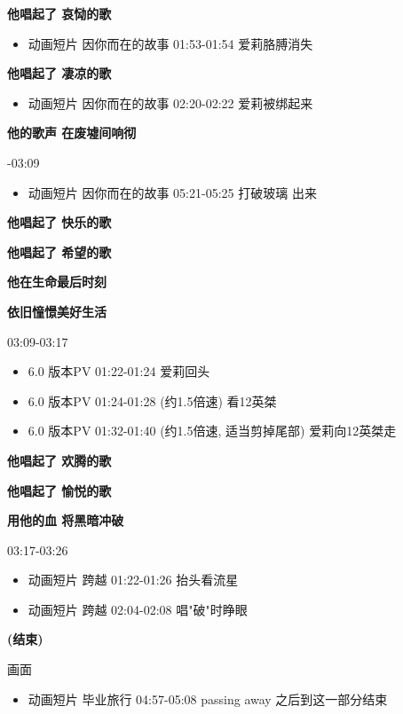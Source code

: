 \documentclass[a4paper]{article}
\begin{document}
\textbf{他唱起了 哀恸的歌}

\begin{itemize}
    \item 动画短片 因你而在的故事 01:53-01:54 爱莉胳膊消失
\end{itemize}

\textbf{他唱起了 凄凉的歌}

\begin{itemize}
    \item 动画短片 因你而在的故事 02:20-02:22 爱莉被绑起来
\end{itemize}

\textbf{他的歌声 在废墟间响彻}

-03:09

\begin{itemize}
    \item 动画短片 因你而在的故事 05:21-05:25 打破玻璃 出来
\end{itemize}

\textbf{他唱起了 快乐的歌}

\textbf{他唱起了 希望的歌}

\textbf{他在生命最后时刻}

\textbf{依旧憧憬美好生活}

03:09-03:17

\begin{itemize}
    \item 6.0 版本PV 01:22-01:24 爱莉回头
    \item 6.0 版本PV 01:24-01:28 (约1.5倍速) 看12英桀
    \item 6.0 版本PV 01:32-01:40 (约1.5倍速, 适当剪掉尾部) 爱莉向12英桀走
\end{itemize}

\textbf{他唱起了 欢腾的歌}

\textbf{他唱起了 愉悦的歌}

\textbf{用他的血 将黑暗冲破}

03:17-03:26

\begin{itemize}
    \item 动画短片 跨越 01:22-01:26 抬头看流星
    \item 动画短片 跨越 02:04-02:08 唱"破"时睁眼
\end{itemize}

\textbf{(结束)}

画面

\begin{itemize}
    \item 动画短片 毕业旅行 04:57-05:08 passing away 之后到这一部分结束
\end{itemize}
\end{document}
